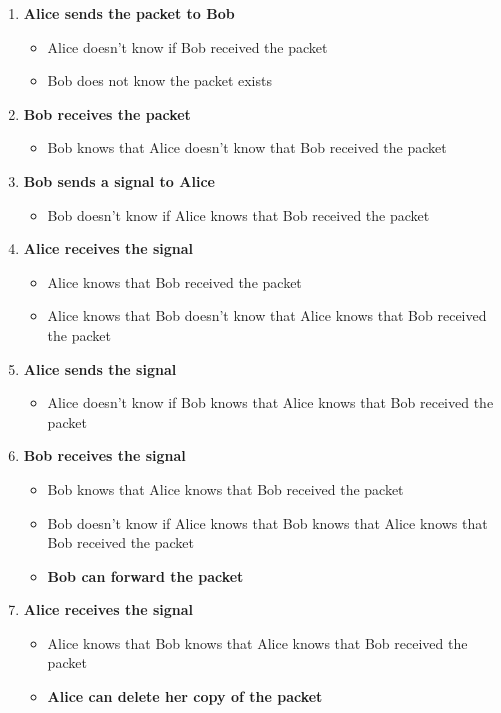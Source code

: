 \documentclass[../../../OAE-SPEC-MAIN.tex]{subfiles}
\begin{document}
\begin{enumerate}[itemsep=0.5ex]
\item \textbf{Alice sends the packet to Bob}
	\begin{itemize}[itemsep=0.2ex]
	\item Alice doesn't know if Bob received the packet
	\item Bob does not know the packet exists
	\end{itemize}

\item \textbf{Bob receives the packet}
	\begin{itemize}[itemsep=0.2ex]
	\item Bob knows that Alice doesn't know that Bob received the packet
	\end{itemize}

\item \textbf{Bob sends a signal to Alice}
	\begin{itemize}[itemsep=0.2ex]
	\item Bob doesn't know if Alice knows that Bob received the packet
	\end{itemize}

\item \textbf{Alice receives the signal}
	\begin{itemize}[itemsep=0.2ex]
	\item Alice knows that Bob received the packet
	\item Alice knows that Bob doesn't know that Alice knows that Bob received the packet
	\end{itemize}

\item \textbf{Alice sends the signal}
	\begin{itemize}[itemsep=0.2ex]
	\item Alice doesn't know if Bob knows that Alice knows that Bob received the packet
	\end{itemize}

\item \textbf{Bob receives the signal}
	\begin{itemize}[itemsep=0.2ex]
	\item Bob knows that Alice knows that Bob received the packet
	\item Bob doesn't know if Alice knows that Bob knows that Alice knows that Bob received the packet
	\item \textbf{Bob can forward the packet}
	\end{itemize}

\item \textbf{Alice receives the signal}
	\begin{itemize}[itemsep=0.2ex]
	\item Alice knows that Bob knows that Alice knows that Bob received the packet
	\item \textbf{Alice can delete her copy of the packet}
	\end{itemize}
\end{enumerate}
\end{document}
